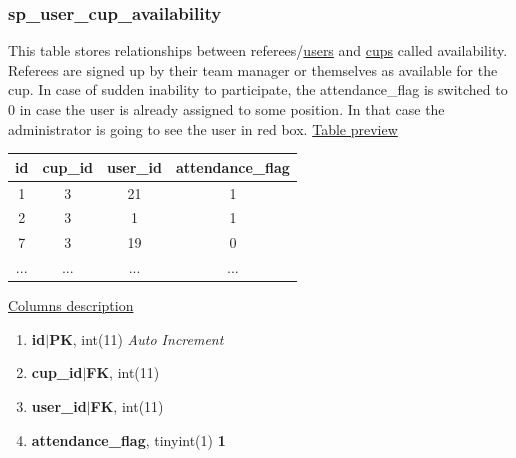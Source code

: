 \subsubsection*{sp\_user\_cup\_availability}
This table stores relationships between referees/\underline{users} and \underline{cups} called availability. Referees are signed up by their team manager or themselves as available for the cup. In case of sudden inability to participate, the attendance\_flag is switched to 0 in case the user is already assigned to some position. In that case the administrator is going to see the user in red box.
\newline
\underline{Table preview}
\begin{center}
 \begin{tabular}{||c c c c||} 
 \hline
 id & cup\_id & user\_id & attendance\_flag  \\ [0.5ex] 
 \hline\hline
 1 & 3 & 21 & 1 \\ 
 \hline
 2 & 3 & 1 & 1 \\ 
 \hline
 7 & 3 & 19 & 0 \\ 
 \hline
 ... & ... & ... & ...  \\ [0.5ex] 
 \hline
\end{tabular}
\end{center}
\underline{Columns description}
\begin{enumerate}
  \setlength\itemsep{0em}
  \item \textbf{id$|$PK}, int(11) \textit{Auto Increment}
  \item \textbf{cup\_id$|$FK}, int(11)
  \item \textbf{user\_id$|$FK}, int(11)
  \item \textbf{attendance\_flag}, tinyint(1) \lbrack \textbf{\textbf{1}}\rbrack 
\end{enumerate}

